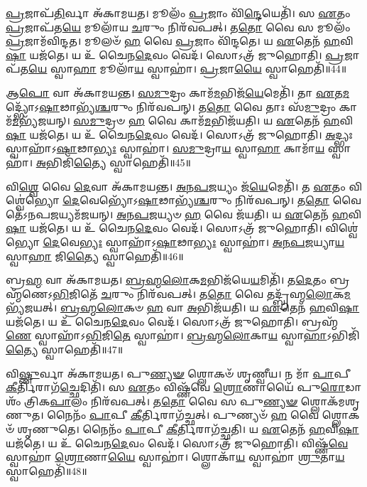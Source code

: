 \-\ul{𑌪𑍍𑌰}\-𑌜𑌾𑌪᳴\-\ul{𑌤𑌿}\-𑌰𑍍𑌵𑌾 𑌅᳴𑌕𑌾𑌮𑌯𑌤।
𑌮𑍂𑌲𑌂᳴ \ul{𑌪𑍍𑌰}\-𑌜𑌾𑌂 𑌵𑌿᳴\-\ul{𑌨𑍍𑌦𑍇}\-𑌯𑍇𑌤𑌿᳴।
𑌸 \ul{𑌏}\-𑌤𑌂 \ul{𑌪𑍍𑌰}\-𑌜𑌾𑌪᳴𑌤\-\ul{𑌯𑍇} 𑌮𑍂𑌲𑌾᳴𑌯 \ul{𑌚}\-𑌰𑍁𑌂 𑌨𑌿𑌰᳴𑌵𑌪𑌤𑍍।
𑌤\-\ul{𑌤𑍋} 𑌵𑍈 𑌸 𑌮𑍂𑌲𑌂᳴ \ul{𑌪𑍍𑌰}\-𑌜𑌾𑌮᳴𑌵𑌿𑌨𑍍𑌦𑌤।
𑌮𑍂𑌲𑍞᳴ \ul{𑌹} 𑌵𑍈 \ul{𑌪𑍍𑌰}\-𑌜𑌾𑌂 𑌵𑌿᳴𑌨𑍍𑌦𑌤𑍇।
𑌯 \ul{𑌏}\-𑌤𑍇𑌨᳴ \ul{𑌹}\-𑌵𑌿\-\ul{𑌷𑌾} 𑌯𑌜᳴𑌤𑍇।
𑌯 𑌉᳴ 𑌚𑍈𑌨\-\ul{𑌦𑍇}\-𑌵𑌂 𑌵𑍇𑌦᳴।
𑌸𑍋𑌽𑌤𑍍𑌰᳴ 𑌜𑍁𑌹𑍋𑌤𑌿।
\-\ul{𑌪𑍍𑌰}\-𑌜𑌾𑌪᳴𑌤\-\ul{𑌯𑍇} 𑌸𑍍𑌵𑌾\-\ul{𑌹𑌾} 𑌮𑍂𑌲𑌾᳴\-\ul{𑌯} 𑌸𑍍𑌵𑌾𑌹𑌾॑।
\-\ul{𑌪𑍍𑌰}\-𑌜𑌾\-\ul{𑌯𑍈} 𑌸𑍍𑌵𑌾𑌹𑍇𑌤𑌿᳴॥44॥

𑌆\-\ul{𑌪𑍋} 𑌵𑌾 𑌅᳴𑌕𑌾𑌮𑌯𑌨𑍍𑌤।
\-\ul{𑌸}\-\-\ul{𑌮𑍁}\-𑌦𑍍𑌰𑌂 𑌕𑌾𑌮᳴\-\ul{𑌮}\-𑌭𑌿𑌜᳴\-\ul{𑌯𑍇}\-𑌮𑍇𑌤𑌿᳴।
𑌤𑌾 \ul{𑌏}\-𑌤\-\ul{𑌮}\-𑌦𑍍𑌭𑍍𑌯𑍋᳴\-𑌽\-\ul{𑌷𑌾}\-𑌢𑌾𑌭𑍍𑌯᳴\-\ul{𑌶𑍍𑌚}\-𑌰𑍁𑌂 𑌨𑌿𑌰᳴𑌵𑌪𑌨𑍍।
𑌤\-\ul{𑌤𑍋} 𑌵𑍈 𑌤𑌾𑌃 𑌸᳴\-\ul{𑌮𑍁}\-𑌦𑍍𑌰𑌂 𑌕𑌾𑌮᳴\-\ul{𑌮}\-𑌭𑍍𑌯᳴𑌜𑌯𑌨𑍍।
\-\ul{𑌸}\-\-\ul{𑌮𑍁}\-𑌦𑍍𑌰𑍞 \ul{𑌹} 𑌵𑍈 𑌕𑌾𑌮᳴\-\ul{𑌮}\-𑌭𑌿𑌜᳴𑌯𑌤𑌿।
𑌯 \ul{𑌏}\-𑌤𑍇𑌨᳴ \ul{𑌹}\-𑌵𑌿\-\ul{𑌷𑌾} 𑌯𑌜᳴𑌤𑍇।
𑌯 𑌉᳴ 𑌚𑍈𑌨\-\ul{𑌦𑍇}\-𑌵𑌂 𑌵𑍇𑌦᳴।
𑌸𑍋𑌽𑌤𑍍𑌰᳴ 𑌜𑍁𑌹𑍋𑌤𑌿।
\-\ul{𑌅}\-𑌦𑍍𑌭𑍍𑌯𑌃 𑌸𑍍𑌵𑌾𑌹𑌾᳴\-𑌽\-\ul{𑌷𑌾}\-𑌢𑌾\-\ul{𑌭𑍍𑌯𑌃} 𑌸𑍍𑌵𑌾𑌹𑌾॑।
\-\ul{𑌸}\-\-\ul{𑌮𑍁}\-𑌦𑍍𑌰𑌾\-\ul{𑌯} 𑌸𑍍𑌵𑌾\-\ul{𑌹𑌾} 𑌕𑌾𑌮𑌾᳴\-\ul{𑌯} 𑌸𑍍𑌵𑌾𑌹𑌾॑।
\-\ul{𑌅}\-𑌭𑌿𑌜𑌿᳴\-\ul{𑌤𑍍𑌯𑍈} 𑌸𑍍𑌵𑌾𑌹𑍇𑌤𑌿᳴॥45॥

𑌵𑌿\-\ul{𑌶𑍍𑌵𑍇} 𑌵𑍈 \ul{𑌦𑍇}\-𑌵𑌾 𑌅᳴𑌕𑌾𑌮𑌯𑌨𑍍𑌤।
\-\ul{𑌅}\-\-\ul{𑌨}\-\-\ul{𑌪}\-\-\ul{𑌜}\-𑌯𑍍𑌯𑌂 𑌜᳴\-\ul{𑌯𑍇}\-𑌮𑍇𑌤𑌿᳴।
𑌤 \ul{𑌏}\-𑌤𑌂 𑌵𑌿𑌶𑍍𑌵𑍇॑𑌭𑍍𑌯𑍋 \ul{𑌦𑍇}\-𑌵𑍇𑌭𑍍𑌯𑍋᳴\-𑌽\-\ul{𑌷𑌾}\-𑌢𑌾𑌭𑍍𑌯᳴\-\ul{𑌶𑍍𑌚}\-𑌰𑍁𑌂 𑌨𑌿𑌰᳴𑌵𑌪𑌨𑍍।
𑌤\-\ul{𑌤𑍋} 𑌵𑍈 𑌤𑍇᳴\-𑌽𑌨𑌪\-\ul{𑌜}\-𑌯𑍍𑌯𑌮᳴𑌜𑌯𑌨𑍍।
\-\ul{𑌅}\-\-\ul{𑌨}\-\-\ul{𑌪}\-\-\ul{𑌜}\-𑌯𑍍𑌯𑍞 \ul{𑌹} 𑌵𑍈 𑌜᳴𑌯𑌤𑌿।
𑌯 \ul{𑌏}\-𑌤𑍇𑌨᳴ \ul{𑌹}\-𑌵𑌿\-\ul{𑌷𑌾} 𑌯𑌜᳴𑌤𑍇।
𑌯 𑌉᳴ 𑌚𑍈𑌨\-\ul{𑌦𑍇}\-𑌵𑌂 𑌵𑍇𑌦᳴।
𑌸𑍋𑌽𑌤𑍍𑌰᳴ 𑌜𑍁𑌹𑍋𑌤𑌿।
𑌵𑌿𑌶𑍍𑌵𑍇॑𑌭𑍍𑌯𑍋 \ul{𑌦𑍇}\-𑌵𑍇\-\ul{𑌭𑍍𑌯𑌃} 𑌸𑍍𑌵𑌾𑌹𑌾᳴\-𑌽\-\ul{𑌷𑌾}\-𑌢𑌾\-\ul{𑌭𑍍𑌯𑌃} 𑌸𑍍𑌵𑌾𑌹𑌾॑।
\-\ul{𑌅}\-\-\ul{𑌨}\-\-\ul{𑌪}\-\-\ul{𑌜}\-𑌯𑍍𑌯𑌾\-\ul{𑌯} 𑌸𑍍𑌵𑌾\-\ul{𑌹𑌾} 𑌜𑌿\-\ul{𑌤𑍍𑌯𑍈} 𑌸𑍍𑌵𑌾𑌹𑍇𑌤𑌿᳴॥46॥

𑌬𑍍𑌰\-\ul{𑌹𑍍𑌮} 𑌵𑌾 𑌅᳴𑌕𑌾𑌮𑌯𑌤।
\-\ul{𑌬𑍍𑌰}\-\-\ul{𑌹𑍍𑌮}\-\-\ul{𑌲𑍋}\-𑌕\-\ul{𑌮}\-𑌭𑌿𑌜᳴𑌯𑍇\-\ul{𑌯}\-𑌮𑌿𑌤𑌿᳴।
𑌤\-\ul{𑌦𑍇}\-𑌤𑌂 𑌬𑍍𑌰𑌹𑍍𑌮᳴𑌣𑍇\-𑌽\-\ul{𑌭𑌿}\-𑌜𑌿𑌤𑍇᳴ \ul{𑌚}\-𑌰𑍁𑌂 𑌨𑌿𑌰᳴𑌵𑌪𑌤𑍍।
𑌤\-\ul{𑌤𑍋} 𑌵𑍈 𑌤𑌦𑍍𑌬𑍍𑌰᳴𑌹𑍍𑌮\-\ul{𑌲𑍋}\-𑌕\-\ul{𑌮}\-𑌭𑍍𑌯᳴𑌜𑌯𑌤𑍍।
\-\ul{𑌬𑍍𑌰}\-\-\ul{𑌹𑍍𑌮}\-\-\ul{𑌲𑍋}\-𑌕𑍞 \ul{𑌹} 𑌵𑌾 \ul{𑌅}\-𑌭𑌿𑌜᳴𑌯𑌤𑌿।
𑌯 \ul{𑌏}\-𑌤𑍇𑌨᳴ \ul{𑌹}\-𑌵𑌿\-\ul{𑌷𑌾} 𑌯𑌜᳴𑌤𑍇।
𑌯 𑌉᳴ 𑌚𑍈𑌨\-\ul{𑌦𑍇}\-𑌵𑌂 𑌵𑍇𑌦᳴।
𑌸𑍋𑌽𑌤𑍍𑌰᳴ 𑌜𑍁𑌹𑍋𑌤𑌿।
𑌬𑍍𑌰𑌹𑍍𑌮᳴\-\ul{𑌣𑍇} 𑌸𑍍𑌵𑌾𑌹𑌾᳴\-𑌽\-\ul{𑌭𑌿}\-𑌜𑌿\-\ul{𑌤𑍇} 𑌸𑍍𑌵𑌾𑌹𑌾॑।
\-\ul{𑌬𑍍𑌰}\-\-\ul{𑌹𑍍𑌮}\-\-\ul{𑌲𑍋}\-𑌕𑌾\-\ul{𑌯} 𑌸𑍍𑌵𑌾\-\ul{𑌹𑌾}\-\-𑌽𑌭𑌿𑌜𑌿᳴\-\ul{𑌤𑍍𑌯𑍈} 𑌸𑍍𑌵𑌾𑌹𑍇𑌤𑌿᳴॥47॥

𑌵𑌿\-\ul{𑌷𑍍𑌣𑍁}\-𑌰𑍍𑌵𑌾 𑌅᳴𑌕𑌾𑌮𑌯𑌤।
𑌪𑍁\-\ul{𑌣𑍍𑌯}\-\-\ul{𑍟} 𑌶𑍍𑌲𑍋𑌕𑍞᳴ 𑌶𑍃𑌣𑍍𑌵𑍀𑌯।
𑌨 𑌮𑌾᳴ \ul{𑌪𑌾}\-𑌪𑍀 \ul{𑌕𑍀}\-𑌰𑍍𑌤𑌿𑌰𑌾𑌗᳴\-\ul{𑌚𑍍𑌛𑍇}\-𑌦𑌿𑌤𑌿᳴।
𑌸 \ul{𑌏}\-𑌤𑌂 𑌵𑌿𑌷𑍍𑌣᳴𑌵𑍇 \ul{𑌶𑍍𑌰𑍋}\-𑌣𑌾𑌯𑍈᳴ 𑌪𑍁\-\ul{𑌰𑍋}\-𑌡𑌾𑌶𑌂᳴ 𑌤𑍍𑌰𑌿𑌕\-\ul{𑌪𑌾}\-𑌲𑌂 𑌨𑌿𑌰᳴𑌵𑌪𑌤𑍍।
𑌤\-\ul{𑌤𑍋} 𑌵𑍈 𑌸 𑌪𑍁\-\ul{𑌣𑍍𑌯}\-\-\ul{𑍟} 𑌶𑍍𑌲𑍋𑌕᳴𑌮𑌶𑍃𑌣𑍁𑌤।
𑌨𑍈𑌨𑌂᳴ \ul{𑌪𑌾}\-𑌪𑍀 \ul{𑌕𑍀}\-𑌰𑍍𑌤𑌿𑌰𑌾𑌗᳴𑌚𑍍𑌛𑌤𑍍।
𑌪𑍁𑌣𑍍𑌯𑍞᳴ \ul{𑌹} 𑌵𑍈 𑌶𑍍𑌲𑍋𑌕𑍞᳴ 𑌶𑍃𑌣𑍁𑌤𑍇।
𑌨𑍈𑌨𑌂᳴ \ul{𑌪𑌾}\-𑌪𑍀 \ul{𑌕𑍀}\-𑌰𑍍𑌤𑌿𑌰𑌾𑌗᳴𑌚𑍍𑌛𑌤𑌿।
𑌯 \ul{𑌏}\-𑌤𑍇𑌨᳴ \ul{𑌹}\-𑌵𑌿\-\ul{𑌷𑌾} 𑌯𑌜᳴𑌤𑍇।
𑌯 𑌉᳴ 𑌚𑍈𑌨\-\ul{𑌦𑍇}\-𑌵𑌂 𑌵𑍇𑌦᳴।
𑌸𑍋𑌽𑌤𑍍𑌰᳴ 𑌜𑍁𑌹𑍋𑌤𑌿।
𑌵𑌿𑌷𑍍𑌣᳴\-\ul{𑌵𑍇} 𑌸𑍍𑌵𑌾𑌹𑌾॑ \ul{𑌶𑍍𑌰𑍋}\-𑌣𑌾\-\ul{𑌯𑍈} 𑌸𑍍𑌵𑌾𑌹𑌾॑।
𑌶𑍍𑌲𑍋𑌕𑌾᳴\-\ul{𑌯} 𑌸𑍍𑌵𑌾𑌹𑌾॑ \ul{𑌶𑍍𑌰𑍁}\-𑌤𑌾\-\ul{𑌯} 𑌸𑍍𑌵𑌾𑌹𑍇𑌤𑌿᳴॥48॥

